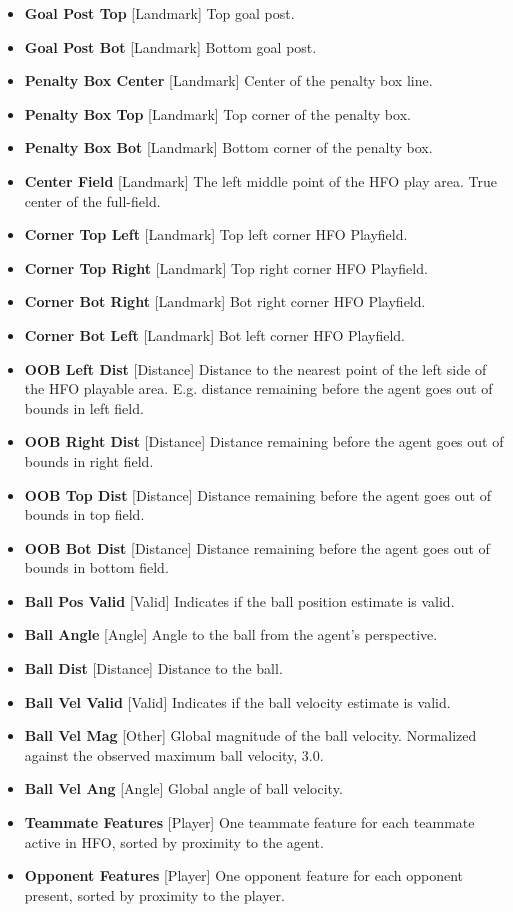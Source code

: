 \documentclass[12pt]{article}
\begin{document}
\begin{itemize}
  \item{\textbf{Goal Post Top} [Landmark] Top goal post.}
  \item{\textbf{Goal Post Bot} [Landmark] Bottom goal post.}
  \item{\textbf{Penalty Box Center} [Landmark] Center of the penalty box line.}
  \item{\textbf{Penalty Box Top} [Landmark] Top corner of the penalty box.}
  \item{\textbf{Penalty Box Bot} [Landmark] Bottom corner of the penalty box.}
  \item{\textbf{Center Field} [Landmark] The left middle point of the
    HFO play area. True center of the full-field.}
  \item{\textbf{Corner Top Left} [Landmark] Top left corner HFO Playfield.}
  \item{\textbf{Corner Top Right} [Landmark] Top right corner HFO Playfield.}
  \item{\textbf{Corner Bot Right} [Landmark] Bot right corner HFO Playfield.}
  \item{\textbf{Corner Bot Left} [Landmark] Bot left corner HFO Playfield.}
  \item{\textbf{OOB Left Dist} [Distance] Distance to the nearest
    point of the left side of the HFO playable area. E.g. distance
    remaining before the agent goes out of bounds in left field.}
  \item{\textbf{OOB Right Dist} [Distance] Distance remaining before
    the agent goes out of bounds in right field.}
  \item{\textbf{OOB Top Dist} [Distance] Distance remaining before
    the agent goes out of bounds in top field.}
  \item{\textbf{OOB Bot Dist} [Distance] Distance remaining before
    the agent goes out of bounds in bottom field.}
  \item{\textbf{Ball Pos Valid} [Valid] Indicates if the ball position estimate is valid.}
  \item{\textbf{Ball Angle} [Angle] Angle to the ball from the agent's perspective.}
  \item{\textbf{Ball Dist} [Distance] Distance to the ball.}
  \item{\textbf{Ball Vel Valid} [Valid] Indicates if the ball velocity estimate is valid.}
  \item{\textbf{Ball Vel Mag} [Other] Global magnitude of the ball velocity. Normalized against the observed maximum ball velocity, 3.0.}
  \item{\textbf{Ball Vel Ang} [Angle] Global angle of ball velocity.}
  \item{\textbf{Teammate Features} [Player] One teammate feature for each teammate active in HFO, sorted by proximity to the agent.}
  \item{\textbf{Opponent Features} [Player] One opponent feature for each opponent present, sorted by proximity to the player.}
\end{itemize}
\end{document}
